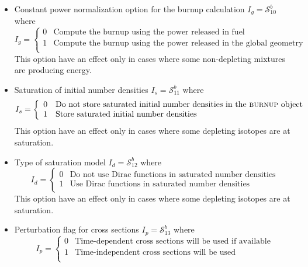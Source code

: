 \begin{itemize}
\item Constant power normalization option for the burnup calculation
$I_{g}=\mathcal{S}^{b}_{10}$ where
\vskip -0.8cm
\begin{displaymath}
I_{g} = \left\{
\begin{array}{rl}
 0 & \textrm{Compute the burnup using the power released in fuel} \\
 1 & \textrm{Compute the burnup using the power released in the global geometry} \\
\end{array} \right.
\end{displaymath}
This option have an effect only in cases
where some non-depleting mixtures are producing energy.

\item Saturation of initial number densities $I_{s}=\mathcal{S}^{b}_{11}$ where
\vskip -0.8cm
\begin{displaymath}
I_{s} = \left\{
\begin{array}{rl}
 0 & \textrm{Do not store saturated initial number densities in the {\sc burnup}
 object} \\
 1 & \textrm{Store saturated initial number densities} \\
\end{array} \right.
\end{displaymath}
This option have an effect only in cases where some depleting isotopes are
at saturation.

\item Type of saturation model $I_{d}=\mathcal{S}^{b}_{12}$ where
\vskip -0.8cm
\begin{displaymath}
I_{d} = \left\{
\begin{array}{rl}
 0 & \textrm{Do not use Dirac functions in saturated number densities} \\
 1 & \textrm{Use Dirac functions in saturated number densities} \\
\end{array} \right.
\end{displaymath}
This option have an effect only in cases where some depleting isotopes are
at saturation.

\item Perturbation flag for cross sections $I_{p}=\mathcal{S}^{b}_{13}$ where
\vskip -0.8cm
\begin{displaymath}
I_{p} = \left\{
\begin{array}{rl}
 0 & \textrm{Time-dependent cross sections will be used if available} \\
 1 & \textrm{Time-independent cross sections will be used} \\
\end{array} \right.
\end{displaymath}


\end{itemize}
